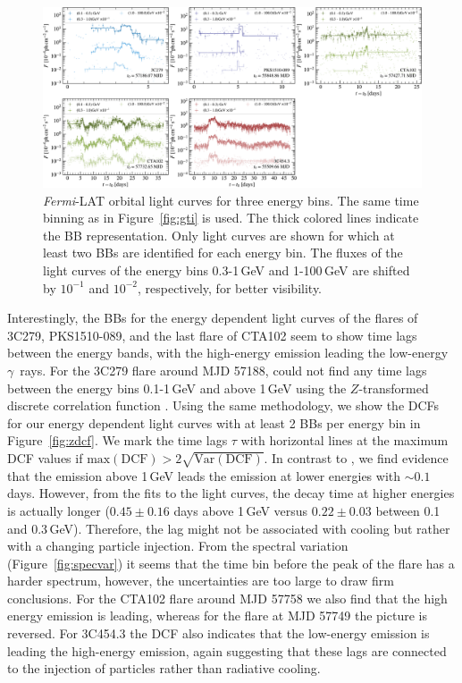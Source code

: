 \documentclass[twocolumn,linenumbers]{aastex62}
\newcommand{\Grays}{$\gamma$~rays\xspace}
\newcommand{\fermiLAT}{\emph{Fermi}-LAT\xspace}
\begin{document}
\begin{figure}
    \centering
    \includegraphics[width = .9 \linewidth]{figures/lc_ebins_ts9.pdf}
    \caption{\fermiLAT orbital light curves for three energy bins. The same time binning as in Figure~\ref{fig:gti} is used. The thick colored lines indicate the BB representation. Only light curves are shown for which at least two BBs are identified for each energy bin. The fluxes of the light curves of the energy bins 0.3-1\,GeV and 1-100\,GeV are shifted by $10^{-1}$ and $10^{-2}$, respectively, for better visibility. }
    \label{fig:lcebins}
\end{figure}

Interestingly, the BBs for the energy dependent light curves of the flares of 3C279, PKS1510-089, and the last flare of CTA102 seem to show time lags between the energy bands, with the high-energy emission leading the low-energy \Grays.
For the 3C279 flare around MJD 57188, \citet{2015ApJ...808L..48P} could not find any time lags between the energy bins 0.1-1\,GeV and above 1\,GeV using the $Z$-transformed discrete correlation function \citep[DCF;][]{1997ASSL..218..163A,2013arXiv1302.1508A}.
Using the same methodology, we show the DCFs for our energy dependent light curves with at least 2 BBs per energy bin in Figure~\ref{fig:zdcf}.
We mark the time lags $\tau$ with horizontal lines at the maximum DCF values if $\mathrm{max}(\mathrm{DCF}) > 2 \sqrt{\mathrm{Var}(\mathrm{DCF})}$.
In contrast to \citet{2015ApJ...808L..48P}, we find evidence that the emission above 1\,GeV leads the emission at lower energies with $\sim 0.1$ days. 
However, from the fits to the light curves, the decay time at higher energies is actually longer ($0.45\pm0.16$ days above 1\,GeV versus $0.22 \pm 0.03$ between 0.1 and 0.3\,GeV). 
Therefore, the lag might not be associated with cooling but rather with a changing particle injection. 
From the spectral variation (Figure~\ref{fig:specvar}) it seems that the time bin before the peak of the flare has a harder spectrum, however, the uncertainties are too large to draw firm conclusions.
For the CTA102 flare around MJD 57758 we also find that the high energy emission is leading, whereas for the flare at MJD 57749 the picture is reversed. 
For 3C454.3 the DCF also indicates that the low-energy emission is leading the high-energy emission, again suggesting that these lags are connected to the injection of particles rather than radiative cooling.
\end{document}
